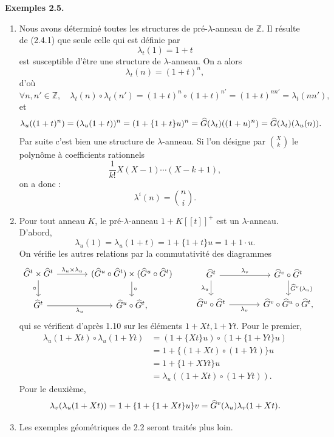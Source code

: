 \documentclass[11pt]{article}
\begin{document}
\textbf{Exemples 2.5.}
\begin{enumerate}[label=\alph*)]
\item Nous avons déterminé toutes les structures de pré-\(\lambda\)-anneau de \(\mathbb Z\). Il résulte de (2.4.1) que seule celle qui est définie par
\[
  \lambda_t(1)=1+t
\]
est susceptible d'être une structure de \(\lambda\)-anneau. On a alors
\[
  \lambda_t(n)=(1+t)^n,
\]
d'où
\[
  \forall n,n'\in\mathbb Z,\quad
  \lambda_t(n)\circ\lambda_t(n')=(1+t)^n\circ(1+t)^{n'}
  =(1+t)^{nn'}=\lambda_t(nn'),
\]
et
\[
  \lambda_u((1+t)^n)
  =
  (\lambda_u(1+t))^n
  =
  (1+\{1+t\}u)^n
  =
  \widehat G(\lambda_t)((1+u)^n)
  =
  \widehat G(\lambda_t)(\lambda_u(n)).
\]
Par suite c'est bien une structure de \(\lambda\)-anneau. Si l'on désigne par \(\binom{X}{k}\) le polynôme à coefficients rationnels
\[
  \frac{1}{k!}X(X-1)\cdots(X-k+1),
\]
on a donc :
\begin{equation}\tag{2.5.1}
  \lambda^i(n)=\binom{n}{i}.
\end{equation}

\item Pour tout anneau \(K\), le pré-\(\lambda\)-anneau \(1+K[[t]]^+\) est un \(\lambda\)-anneau. D'abord,
\[
  \lambda_u(1)=\lambda_u(1+t)=1+\{1+t\}u=1+1\cdot u.
\]
On vérifie les autres relations par la commutativité des diagrammes
\[
\begin{tikzcd}[column sep=large]
\Ghat^t\times\Ghat^t \arrow[r,"\lambda_u\times\lambda_u"] \arrow[d,"\circ"'] &
(\Ghat^u\circ\Ghat^t)\times(\Ghat^u\circ\Ghat^t) \arrow[d,"\circ"]\\
\Ghat^t \arrow[r,"\lambda_u"'] &
\Ghat^u\circ\Ghat^t,
\end{tikzcd}
\qquad
\begin{tikzcd}[column sep=large]
\Ghat^t \arrow[r,"\lambda_v"] \arrow[d,"\lambda_u"'] &
\Ghat^v\circ\Ghat^t \arrow[d,"\Ghat^v(\lambda_u)"]\\
\Ghat^u\circ\Ghat^t \arrow[r,"\lambda_v"'] &
\Ghat^v\circ\Ghat^u\circ\Ghat^t,
\end{tikzcd}
\]
qui se vérifient d'après 1.10 sur les éléments \(1+Xt,1+Yt\). Pour le premier,
\[
\begin{aligned}
\lambda_u(1+Xt)\circ\lambda_u(1+Yt)
&=(1+\{Xt\}u)\circ(1+\{1+Yt\}u)\\
&=1+\{(1+Xt)\circ(1+Yt)\}u\\
&=1+\{1+XYt\}u\\
&=\lambda_u((1+Xt)\circ(1+Yt)).
\end{aligned}
\]
Pour le deuxième,
\[
  \lambda_v(\lambda_u(1+Xt))
  =
  1+\{1+\{1+Xt\}u\}v
  =
  \widehat G^v(\lambda_u)\lambda_v(1+Xt).
\]

\item Les exemples géométriques de 2.2 seront traités plus loin.
\end{enumerate}
\end{document}
